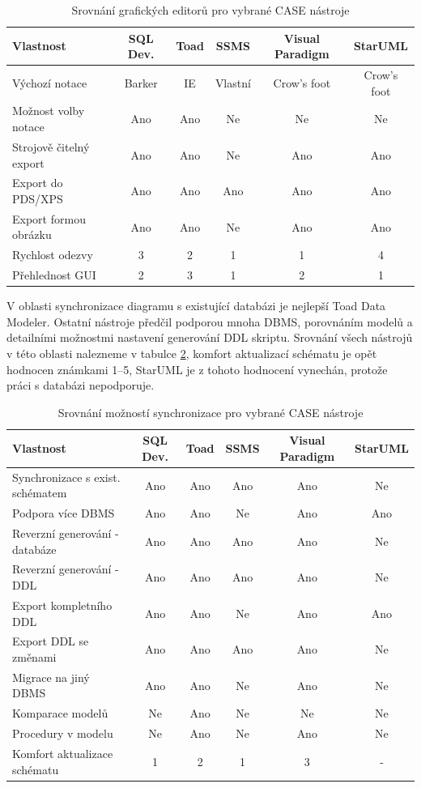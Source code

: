 \documentclass[czech,bachelor,public,dept460,male,oneside]{diploma}
\begin{document}
	\begin{table}[h!]
		\centering
		\caption{Srovnání grafických editorů pro vybrané CASE nástroje}
		\label{tab:geditCmp}
		\begin{tabular}{l c c c c c}
			\toprule
			Vlastnost & SQL Dev. & Toad & SSMS & Visual Paradigm & StarUML \\
			\midrule
			Výchozí notace & Barker & IE & Vlastní & Crow's foot & Crow's foot \\
			Možnost volby notace & Ano & Ano & Ne & Ne & Ne \\
			Strojově čitelný export & Ano & Ano & Ne & Ano & Ano \\
			Export do PDS/XPS & Ano & Ano & Ano & Ano & Ano \\
			Export formou obrázku & Ano & Ano & Ne & Ano & Ano \\
			Rychlost odezvy & 3 & 2 & 1 & 1 & 4 \\
			Přehlednost GUI & 2 & 3 & 1 & 2 & 1 \\
			\midrule
		\end{tabular}
	\end{table}
	
	\newpage
	V oblasti synchronizace diagramu s existující databázi je nejlepší Toad Data Modeler. Ostatní nástroje předčil podporou mnoha DBMS, porovnáním modelů a detailními možnostmi nastavení generování DDL skriptu. Srovnání všech nástrojů v této oblasti nalezneme v tabulce \ref{tab:ddlCreateCmp}, komfort aktualizací schématu je opět hodnocen známkami 1--5, StarUML je z tohoto hodnocení vynechán, protože práci s databázi nepodporuje.
	
	\begin{table}[!h]
		\centering
		\caption{Srovnání možností synchronizace pro vybrané CASE nástroje}
		\label{tab:ddlCreateCmp}
		\begin{tabular}{l c c c c c}
			\toprule
			Vlastnost & SQL Dev. & Toad & SSMS & Visual Paradigm & StarUML \\
			\midrule
			Synchronizace s exist. schématem & Ano & Ano & Ano & Ano & Ne \\
			Podpora více DBMS & Ano & Ano & Ne & Ano & Ano \\
			Reverzní generování - databáze & Ano & Ano & Ano & Ano & Ne \\
			Reverzní generování - DDL & Ano & Ano & Ano & Ano & Ne  \\
			Export kompletního DDL & Ano & Ano & Ne & Ano & Ano \\
			Export DDL se změnami & Ano & Ano & Ano & Ano & Ne \\
			Migrace na jiný DBMS & Ano & Ano & Ne & Ano & Ne \\
			Komparace modelů & Ne & Ano & Ne & Ne & Ne \\
			Procedury v modelu & Ne & Ano & Ne & Ano & Ne \\
			Komfort aktualizace schématu & 1 & 2 & 1 & 3 & - \\
			\midrule
		\end{tabular}
	\end{table}
	
\end{document}
